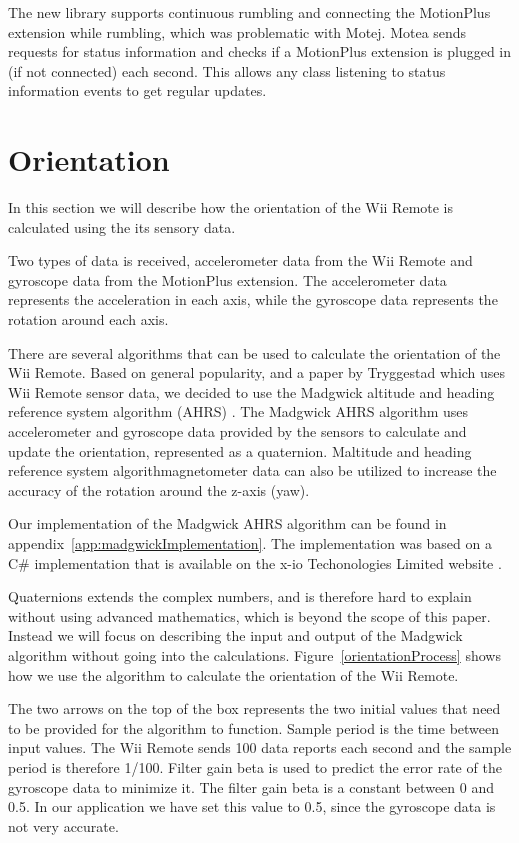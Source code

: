The new library supports continuous rumbling and connecting the MotionPlus extension while rumbling, which was problematic with Motej. Motea sends requests for status information and checks if a MotionPlus extension is plugged in (if not connected) each second. This allows any class listening to status information events to get regular updates.

\section{Orientation}
In this section we will describe how the orientation of the Wii Remote is calculated using the its sensory data.

Two types of data is received, accelerometer data from the Wii Remote and gyroscope data from the MotionPlus extension. The accelerometer data represents the acceleration in each axis, while the gyroscope data represents the rotation around each axis.

There are several algorithms that can be used to calculate the orientation of the Wii Remote. Based on general popularity, and a paper by Tryggestad \cite{Tryggestad} which uses Wii Remote sensor data, we decided to use the Madgwick altitude and heading reference system algorithm (AHRS) \cite{madgwick}. The Madgwick AHRS algorithm uses accelerometer and gyroscope data provided by the sensors to calculate and update the orientation, represented as a quaternion. Maltitude and heading reference system algorithmagnetometer data can also be utilized to increase the accuracy of the rotation around the z-axis (yaw).

Our implementation of the Madgwick AHRS algorithm can be found in appendix~\ref{app:madgwickImplementation}. The implementation was based on a C\# implementation that is available on the x-io Techonologies Limited website \cite{opensourceMadgwick}. 

Quaternions extends the complex numbers, and is therefore hard to explain without using advanced mathematics, which is beyond the scope of this paper. Instead we will focus on describing the input and output of the Madgwick algorithm without going into the calculations. Figure~\ref{orientationProcess} shows how we use the algorithm to calculate the orientation of the Wii Remote. 

The two arrows on the top of the box represents the two initial values that need to be provided for the algorithm to function. Sample period is the time between input values. The Wii Remote sends 100 data reports each second and the sample period is therefore 1/100. Filter gain beta is used to predict the error rate of the gyroscope data to minimize it. The filter gain beta is a constant between 0 and 0.5. In our application we have set this value to 0.5, since the gyroscope data is not very accurate.

